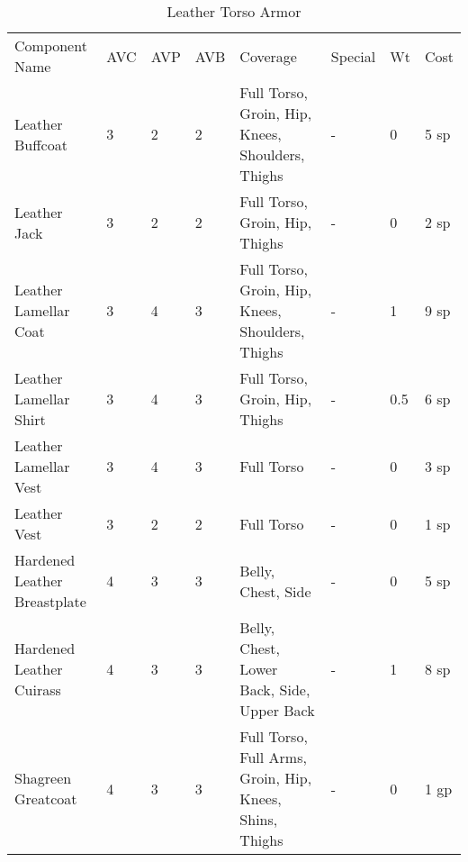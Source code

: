 \documentclass[oneside,11pt,english]{book}
\begin{document}
\begin{longtabu}to 
	\caption{Leather Torso Armor}
	\label{tab:Leather Torso Armor}\\
Component Name&AVC&AVP&AVB& Coverage& Special& Wt&Cost\\
Leather Buffcoat& 3& 2& 2& Full Torso, Groin, Hip, Knees, Shoulders, Thighs &-& 0& 5 sp\\
Leather Jack& 3& 2& 2& Full Torso, Groin, Hip, Thighs &-& 0& 2 sp\\
Leather Lamellar Coat& 3& 4& 3& Full Torso, Groin, Hip, Knees, Shoulders, Thighs &-& 1& 9 sp\\
Leather Lamellar Shirt& 3& 4& 3& Full Torso, Groin, Hip, Thighs &-& 0.5& 6 sp\\
Leather Lamellar Vest& 3& 4& 3& Full Torso &-& 0& 3 sp\\
Leather Vest& 3& 2& 2& Full Torso &-& 0& 1 sp\\
Hardened Leather Breastplate& 4& 3& 3& Belly, Chest, Side &-& 0& 5 sp\\
Hardened Leather Cuirass& 4& 3& 3& Belly, Chest, Lower Back, Side, Upper Back &-& 1& 8 sp\\
Shagreen Greatcoat& 4& 3& 3& Full Torso, Full Arms, Groin, Hip, Knees, Shins, Thighs &-& 0& 1 gp\\\bottomrule
\end{longtabu}
\end{document}
